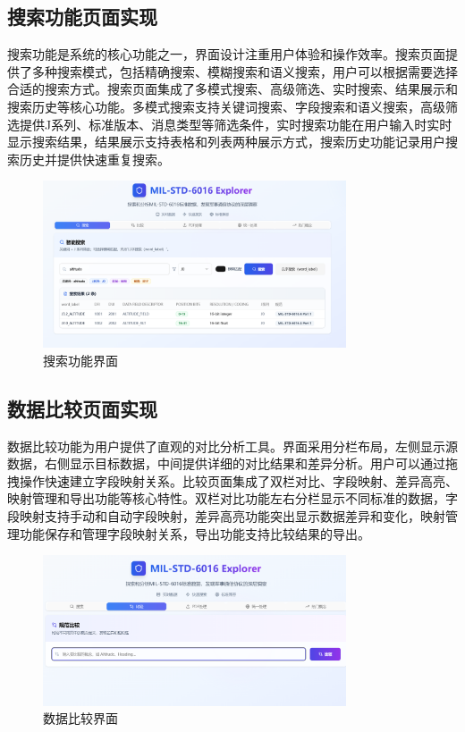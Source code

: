 \subsection{搜索功能页面实现}

搜索功能是系统的核心功能之一，界面设计注重用户体验和操作效率。搜索页面提供了多种搜索模式，包括精确搜索、模糊搜索和语义搜索，用户可以根据需要选择合适的搜索方式。搜索页面集成了多模式搜索、高级筛选、实时搜索、结果展示和搜索历史等核心功能。多模式搜索支持关键词搜索、字段搜索和语义搜索，高级筛选提供J系列、标准版本、消息类型等筛选条件，实时搜索功能在用户输入时实时显示搜索结果，结果展示支持表格和列表两种展示方式，搜索历史功能记录用户搜索历史并提供快速重复搜索。

\begin{figure}[H]
\centering
\includegraphics[width=0.8\textwidth]{chapters/fig-0/front-search.png}
\caption{搜索功能界面}
\label{fig:frontend-search}
\end{figure}

\subsection{数据比较页面实现}

数据比较功能为用户提供了直观的对比分析工具。界面采用分栏布局，左侧显示源数据，右侧显示目标数据，中间提供详细的对比结果和差异分析。用户可以通过拖拽操作快速建立字段映射关系。比较页面集成了双栏对比、字段映射、差异高亮、映射管理和导出功能等核心特性。双栏对比功能左右分栏显示不同标准的数据，字段映射支持手动和自动字段映射，差异高亮功能突出显示数据差异和变化，映射管理功能保存和管理字段映射关系，导出功能支持比较结果的导出。

\begin{figure}[H]
\centering
\includegraphics[width=0.8\textwidth]{chapters/fig-0/front_compare.png}
\caption{数据比较界面}
\label{fig:frontend-compare}
\end{figure}

